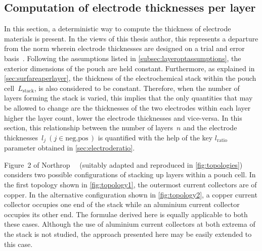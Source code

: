 \subsection{Computation of electrode thicknesses per layer}

In  this section,  a deterministic  way to  compute the  thickness of  electrode
materials is  present. In  the views  of this thesis  author, this  represents a
departure from  the norm wherein electrode  thicknesses are designed on  a trial
and  error basis~\cite{Ramadesigan2012}.  Following  the  assumptions listed  in
\cref{subsec:layeroptassumptions},  the exterior  dimensions  of  the pouch  are
held  constant. Furthermore,  as explained  in \cref{sec:surfareaperlayer},  the
thickness of  the electrochemical stack within  the pouch cell~$L_\text{stack}$,
is also considered to be constant.  Therefore, when the number of layers forming
the stack is varied,  this implies that the only quantities  that may be allowed
to change  are the  thicknesses of  the two electrodes  within each  layer \ie{}
higher the layer count, lower the  electrode thicknesses and vice-versa. In this
section, this  relationship between the  number of layers~$n$ and  the electrode
thicknesses~$l_j\ (j  \in {\text{neg},\text{pos}})$ is quantified  with the help
of the key $l_\text{ratio}$ parameter obtained in \cref{sec:electroderatio}.

Figure~2 of Northrop~\etal~\cite{Northrop2011}  (suitably adapted and reproduced
in \cref{fig:topologies})  considers two possible configurations  of stacking up
layers within a pouch cell. In the first topology shown in \cref{fig:topology1},
the outermost current collectors are of copper. In the alternative configuration
shown in  \cref{fig:topology2}, a copper  current collector occupies one  end of
the  stack while  an aluminium  current collector  occupies its  other end.  The
formulae derived  here is equally applicable  to both these cases.  Although the
use of aluminium current collectors at both extrema of the stack is not studied,
the approach presented here may be easily extended to this case.

